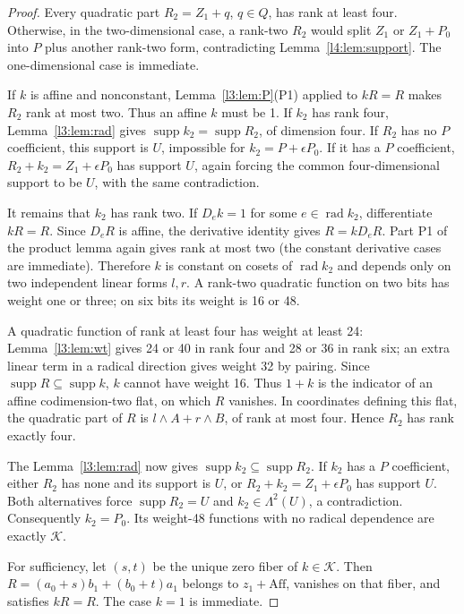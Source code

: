 \documentclass[11pt,a4paper]{article}
\theoremstyle{plain}
\theoremstyle{remark}
\newcommand{\Aff}{\mathrm{Aff}}
\newcommand{\supp}{\operatorname{supp}}
\newcommand{\rad}{\operatorname{rad}}
\begin{document}
\begin{proof}
Every quadratic part $R_2=Z_1+q$, $q\in Q$, has rank at least four. Otherwise, in the two-dimensional case, a rank-two $R_2$ would split $Z_1$ or $Z_1+P_0$ into $P$ plus another rank-two form, contradicting Lemma~\ref{l4:lem:support}. The one-dimensional case is immediate.

If $k$ is affine and nonconstant, Lemma~\ref{l3:lem:P}(P1) applied to $kR=R$ makes $R_2$ rank at most two. Thus an affine $k$ must be 1. If $k_2$ has rank four, Lemma~\ref{l3:lem:rad} gives $\supp k_2=\supp R_2$, of dimension four. If $R_2$ has no $P$ coefficient, this support is $U$, impossible for $k_2=P+\epsilon P_0$. If it has a $P$ coefficient, $R_2+k_2=Z_1+\epsilon P_0$ has support $U$, again forcing the common four-dimensional support to be $U$, with the same contradiction.

It remains that $k_2$ has rank two. If $D_ek=1$ for some $e\in\rad k_2$, differentiate $kR=R$. Since $D_eR$ is affine, the derivative identity gives $R=kD_eR$. Part P1 of the product lemma again gives rank at most two (the constant derivative cases are immediate). Therefore $k$ is constant on cosets of $\rad k_2$ and depends only on two independent linear forms $l,r$. A rank-two quadratic function on two bits has weight one or three; on six bits its weight is 16 or 48.

A quadratic function of rank at least four has weight at least 24: Lemma~\ref{l3:lem:wt} gives 24 or 40 in rank four and 28 or 36 in rank six; an extra linear term in a radical direction gives weight 32 by pairing. Since $\supp R\subseteq\supp k$, $k$ cannot have weight 16. Thus $1+k$ is the indicator of an affine codimension-two flat, on which $R$ vanishes. In coordinates defining this flat, the quadratic part of $R$ is $l\wedge A+r\wedge B$, of rank at most four. Hence $R_2$ has rank exactly four.

The Lemma~\ref{l3:lem:rad} now gives $\supp k_2\subseteq\supp R_2$. If $k_2$ has a $P$ coefficient, either $R_2$ has none and its support is $U$, or $R_2+k_2=Z_1+\epsilon P_0$ has support $U$. Both alternatives force $\supp R_2=U$ and $k_2\in\Lambda^2(U)$, a contradiction. Consequently $k_2=P_0$. Its weight-48 functions with no radical dependence are exactly $\mathcal K$.

For sufficiency, let $(s,t)$ be the unique zero fiber of $k\in\mathcal K$. Then $R=(a_0+s)b_1+(b_0+t)a_1$ belongs to $z_1+\Aff$, vanishes on that fiber, and satisfies $kR=R$. The case $k=1$ is immediate.
\end{proof}
\end{document}
